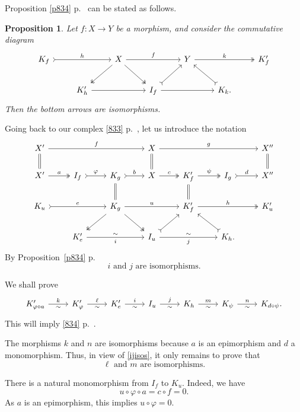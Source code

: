 \documentclass[12pt]{article}
\newtheorem{prop}[thm]{Proposition}
\theoremstyle{remark}
\theoremstyle{definition}
\newcommand{\pp}{\varphi}
\begin{document}
Proposition \ref{p834} p.~\pageref{p834} can be stated as follows. 
%
\begin{prop}\label{p834b}
Let $f:X\to Y$ be a morphism, and consider the commutative diagram 
$$
\begin{tikzcd}
K_f\ar[tail]{rr}{h}&&X\ar{rr}{f}\ar[two heads]{dl}\ar[two heads]{dr}&&Y\ar[two heads]{rr}{k}&&K'_f\\ 
&K'_h\ar{rr}&&I_f\ar[tail]{ur}\ar{rr}&&K_k.\ar[tail]{ul}
\end{tikzcd}
$$ 
Then the bottom arrows are isomorphisms.
\end{prop}
%
Going back to our complex \eqref{833} p.~\pageref{833}, let us introduce the notation 
$$
\begin{tikzcd}
X'\ar{rrr}{f}\ar[equal]{d}&&&X\ar[equal]{d}\ar{rrr}{g}&&&X''\ar[equal]{d}\\ 
X'\ar[two heads]{r}{a}&I_f\ar[tail]{r}{\pp}&K_g\ar[equal]{d}\ar[tail]{r}{b}&X\ar[two heads]{r}{c}&K'_f\ar[equal]{d}\ar[two heads]{r}{\psi}&I_g\ar[tail]{r}{d}&X''\\ 
K_u\ar[tail]{rr}{e}&&K_g\ar[two heads]{dl}\ar[two heads]{dr}\ar{rr}{u}&&K'_f\ar[two heads]{rr}{h}&&K'_u\\ 
&K'_e\ar{rr}{\sim}[swap]{i}&&I_u\ar[tail]{ur}\ar{rr}{\sim}[swap]{j}&&K_h.\ar[tail]{ul}
\end{tikzcd}
$$ 
By Proposition~\ref{p834} p.~\pageref{p834} 
\begin{equation}\label{ijisos}
i\text{ and }j\text{ are isomorphisms.}
\end{equation}

We shall prove 
$$
\begin{tikzcd}
K'_{\pp\circ a}\ar{r}{k}[swap]{\sim}&K'_\pp\ar{r}{\ell}[swap]{\sim}&K'_e\ar{r}{i}[swap]{\sim}&I_u\ar{r}{j}[swap]{\sim}&K_h\ar{r}{m}[swap]{\sim}&K_\psi\ar{r}{n}[swap]{\sim}&K_{d\circ\psi}.
\end{tikzcd}
$$
This will imply \eqref{834} p.~\pageref{834}. 

The morphisms $k$ and $n$ are isomorphisms because $a$ is an epimorphism and $d$ a monomorphism. Thus, in view of \eqref{ijisos}, it only remains to prove that 
\begin{equation}\label{lmisos}
\ell\text{ and }m\text{ are isomorphisms.}
\end{equation}

There is a natural monomorphism from $I_f$ to $K_u$. Indeed, we have 
$$
u\circ\pp\circ a=c\circ f=0.
$$ 
As $a$ is an epimorphism, this implies $u\circ\pp=0$. 
\end{document}
